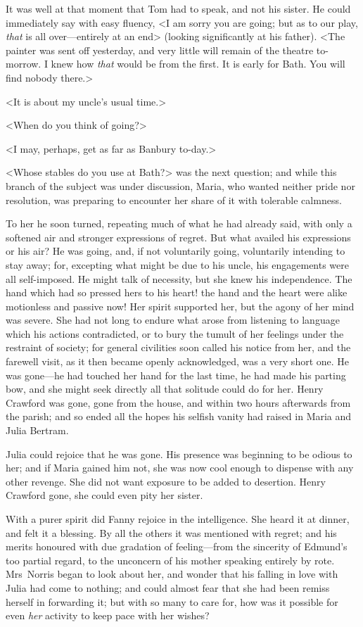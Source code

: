 It was well at that moment that Tom had to speak, and not his sister. He could immediately say with easy fluency, <I am sorry you are going; but as to our play, \textit{that}  is all over—entirely at an end> (looking significantly at his father). <The painter was sent off yesterday, and very little will remain of the theatre to-morrow. I knew how \textit{that}  would be from the first. It is early for Bath. You will find nobody there.>

<It is about my uncle's usual time.>

<When do you think of going?>

<I may, perhaps, get as far as Banbury to-day.>

<Whose stables do you use at Bath?> was the next question; and while this branch of the subject was under discussion, Maria, who wanted neither pride nor resolution, was preparing to encounter her share of it with tolerable calmness.

To her he soon turned, repeating much of what he had already said, with only a softened air and stronger expressions of regret. But what availed his expressions or his air? He was going, and, if not voluntarily going, voluntarily intending to stay away; for, excepting what might be due to his uncle, his engagements were all self-imposed. He might talk of necessity, but she knew his independence. The hand which had so pressed hers to his heart! the hand and the heart were alike motionless and passive now! Her spirit supported her, but the agony of her mind was severe. She had not long to endure what arose from listening to language which his actions contradicted, or to bury the tumult of her feelings under the restraint of society; for general civilities soon called his notice from her, and the farewell visit, as it then became openly acknowledged, was a very short one. He was gone—he had touched her hand for the last time, he had made his parting bow, and she might seek directly all that solitude could do for her. Henry Crawford was gone, gone from the house, and within two hours afterwards from the parish; and so ended all the hopes his selfish vanity had raised in Maria and Julia Bertram.

Julia could rejoice that he was gone. His presence was beginning to be odious to her; and if Maria gained him not, she was now cool enough to dispense with any other revenge. She did not want exposure to be added to desertion. Henry Crawford gone, she could even pity her sister.

With a purer spirit did Fanny rejoice in the intelligence. She heard it at dinner, and felt it a blessing. By all the others it was mentioned with regret; and his merits honoured with due gradation of feeling—from the sincerity of Edmund's too partial regard, to the unconcern of his mother speaking entirely by rote. Mrs~Norris began to look about her, and wonder that his falling in love with Julia had come to nothing; and could almost fear that she had been remiss herself in forwarding it; but with so many to care for, how was it possible for even \textit{her}  activity to keep pace with her wishes?

